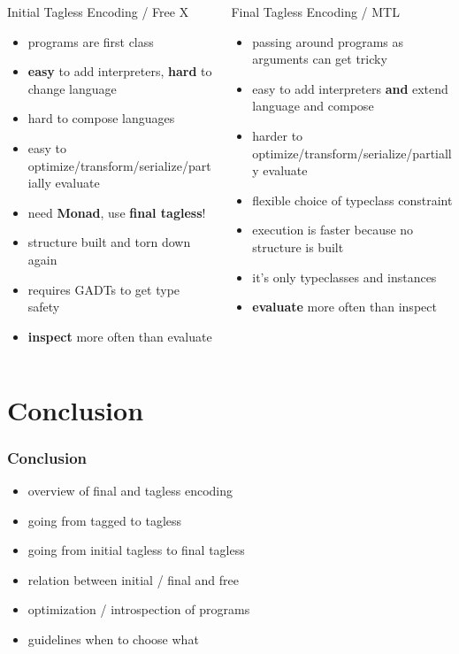 \documentclass[aspectratio=169, hyperref={colorlinks, linkcolor=beamer@centricgreen}, urlcolor=links]{beamer}
\begin{document}
\begin{frame}[t]
  \small{}
  \begin{columns}
    \begin{column}{0.5\textwidth}
      Initial Tagless Encoding / Free X
      \begin{itemize}
      \item programs are first class
      \item \textbf{easy} to add interpreters, \textbf{hard} to change language
      \item hard to compose languages
      \item easy to optimize/transform/serialize/partially evaluate
      \item need \textbf{Monad}, use \textbf{final tagless}!
      \item structure built and torn down again
      \item requires GADTs to get type safety
      \item \textbf{inspect} more often than evaluate
      \end{itemize}
    \end{column}
    \begin{column}{0.5\textwidth}
      Final Tagless Encoding / MTL
      \begin{itemize}
      \item passing around programs as arguments can get tricky
      \item easy to add interpreters \textbf{and} extend language and compose
      \item harder to optimize/transform/serialize/partially evaluate
      \item flexible choice of typeclass constraint
      \item execution is faster because no structure is built
      \item it's only typeclasses and instances
      \item \textbf{evaluate} more often than inspect
      \end{itemize}
    \end{column}
  \end{columns}
\end{frame}

\section{Conclusion}\label{sec:conclusion}

\begin{frame}
  \frametitle{Conclusion}
  \begin{itemize}
  \item overview of final and tagless encoding
  \item going from tagged to tagless
  \item going from initial tagless to final tagless
  \item relation between initial / final and free
  \item optimization / introspection of programs
  \item guidelines when to choose what
  \end{itemize}
\end{frame}
\end{document}
